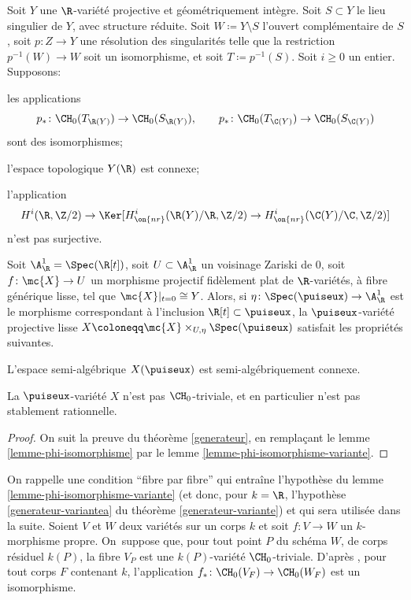 \begin{thm}\label{generateur-variante}
Soit $Y$ une $\R$-variété projective et géométriquement intègre. Soit $S\subset Y$ le lieu singulier de $Y$, avec structure réduite. Soit $W\coloneqq Y\setminus S$ l'ouvert complémentaire de $S$, soit $p\colon Z\to Y$ une résolution des singularités telle que la restriction $p^{-1}(W)\to W$ soit un isomorphisme, et soit $T\coloneqq p^{-1}(S)$. Soit $i\geq 0$ un entier. Supposons:

\begin{enumeratea}
\item\label{generateur-variantea}
les applications
\[p_*\colon \CH_0(T_{\R(Y)})\to \CH_0(S_{\R(Y)}),\qquad p_*\colon \CH_0(T_{\C(Y)})\to \CH_0(S_{\C(Y)})\] sont des isomorphismes;
\item\label{generateur-varianteb}
l'espace topologique $Y(\R)$ est connexe;
\item\label{generateur-variantec}
l'application
\[H^i(\R,\Z/2) \to \Ker [H^i_{\on{nr}}(\R(Y)/\R,\Z/2) \to H^i_{\on{nr}}(\C(Y)/\C,\Z/2)]\] n'est pas surjective.
\end{enumeratea}

Soit $\A^1_\R=\Spec(\R[t])$, soit $U\subset \A^1_\R$ un voisinage Zariski de $0$, soit $f\colon \mc{X}\to U$ un morphisme projectif fidèlement plat de $\R$-variétés, à fibre générique lisse, tel que $\mc{X}|_{t=0}\cong Y$. Alors, si $\eta\colon \Spec(\puiseux)\to\A^1_\R$ est le morphisme correspondant à l'inclusion $\R[t]\subset \puiseux$, la $\puiseux$-variété projective lisse $X\coloneqq \mc{X}\times_{U,\eta}\Spec(\puiseux)$ satisfait les propriétés suivantes.

\begin{enumeratei}
\item\label{generateur-variantei}
L'espace semi-algébrique $X(\puiseux)$ est semi-algébriquement connexe.
\item\label{generateur-varianteii}
La $\puiseux$-variété $X$ n'est pas $\CH_0$-triviale, et en particulier
n'est pas stablement rationnelle.
\end{enumeratei}
\end{thm}

\begin{proof}
On suit la preuve du théorème \ref{generateur}, en remplaçant le lemme \ref{lemme-phi-isomorphisme} par le lemme \ref{lemme-phi-isomorphisme-variante}.
\end{proof}

\begin{rmk}\label{fibre-par-fibre}
On rappelle une condition \enquote{fibre par fibre} qui entraîne l'hypothèse du lemme \ref{lemme-phi-isomorphisme-variante} (et donc, pour $k=\R$, l'hypothèse \eqref{generateur-variantea} du théorème \ref{generateur-variante}) et qui sera utilisée dans la suite. Soient $V$ et $W$ deux variétés sur un corps $k$ et soit $f\colon V\to W$ un $k$-morphisme propre. On~suppose que, pour tout point $P$ du schéma $W$, de corps résiduel $k(P)$, la fibre $V_P$ est une $k(P)$-variété $\CH_0$-triviale. D'après \cite[Prop.\,1.8]{colliot2016hypersurfaces}, pour tout corps $F$ contenant $k$, l'application $f_*\colon \CH_0(V_F)\to \CH_0(W_F)$ est un isomorphisme.
\end{rmk}

